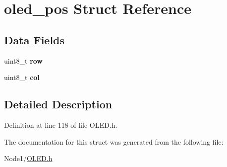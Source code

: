 \hypertarget{structoled__pos}{}\section{oled\+\_\+pos Struct Reference}
\label{structoled__pos}
\subsection*{Data Fields}
\begin{DoxyCompactItemize}
\item 
\mbox{\label{structoled__pos_af7cfc64ac1710a3e8f1c61eb4aa66cdf}} 
uint8\+\_\+t {\bfseries row}
\item 
\mbox{\label{structoled__pos_a9970f83c83a9307713651e361bf5ca1e}} 
uint8\+\_\+t {\bfseries col}
\end{DoxyCompactItemize}


\subsection{Detailed Description}


Definition at line 118 of file O\+L\+E\+D.\+h.



The documentation for this struct was generated from the following file\+:\begin{DoxyCompactItemize}
\item 
Node1/\hyperlink{OLED_8h}{O\+L\+E\+D.\+h}\end{DoxyCompactItemize}
